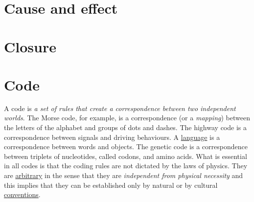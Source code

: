 \documentclass[12pt]{article}
\begin{document}
\hypertarget{cause_and_effect}{}
\section{Cause and effect}


\hypertarget{closure}{}
\section{Closure}

\hypertarget{code}{}
\section{Code}
A code is \textit{a set of rules that create a correspondence between two independent worlds}. The Morse code, for example, is a correspondence (or a \textit{mapping}) between the letters of the alphabet and groups of dots and dashes. The highway code is a correspondence between signals and driving behaviours. A \hyperlink{language}{language} is a correspondence between words and objects. The genetic code is a correspondence between triplets of nucleotides, called codons, and amino acids. What is essential in all codes is that the coding rules are not dictated by the laws of physics. They are \hyperlink{arbitrariness}{arbitrary} in the sense that they are \textit{independent from physical necessity} and this implies that they can be established only by natural or by cultural \hyperlink{convention}{conventions}. 


\hypertarget{code_biology}{}
\end{document}
